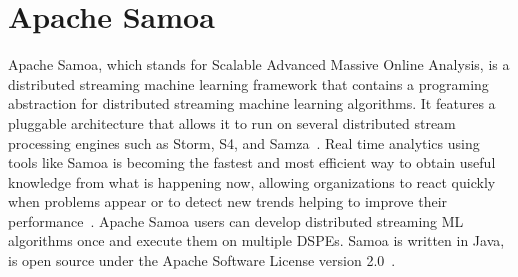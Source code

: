 \section{Apache Samoa}
Apache Samoa, which stands for Scalable Advanced Massive Online Analysis, is a distributed streaming 
machine learning framework that contains a programing abstraction for distributed streaming machine 
learning algorithms. It features a pluggable architecture that allows it to run on several distributed 
stream processing engines such as Storm, S4, and Samza~\cite{hid-sp18-405-www-samoa}. Real time 
analytics using tools like Samoa is becoming the fastest and most efficient way to obtain useful 
knowledge from what is happening now, allowing organizations to react quickly when problems appear 
or to detect new trends helping to improve their 
performance~\cite{hid-sp18-405-bif2015mining-samoa}. Apache Samoa users can develop distributed 
streaming ML algorithms once and execute them on multiple DSPEs. Samoa is written in Java, is open 
source under the Apache Software License version 2.0~\cite{hid-sp18-405-mor2015samoa-samoa}.
